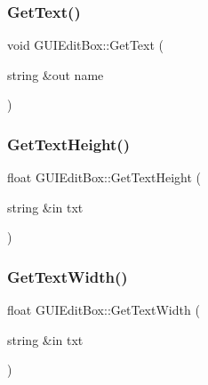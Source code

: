 \hypertarget{class_g_u_i_edit_box_a5a362705212d4106b49bcb913b098bf9}{}\label{class_g_u_i_edit_box_a5a362705212d4106b49bcb913b098bf9} 
\subsubsection{\texorpdfstring{Get\+Text()}{GetText()}}
{\footnotesize\ttfamily void G\+U\+I\+Edit\+Box\+::\+Get\+Text (\begin{DoxyParamCaption}\item[{string \&out}]{name }\end{DoxyParamCaption})}

\hypertarget{class_g_u_i_edit_box_abe03092a77e9a1d174ec2b4451c099d2}{}\label{class_g_u_i_edit_box_abe03092a77e9a1d174ec2b4451c099d2} 
\subsubsection{\texorpdfstring{Get\+Text\+Height()}{GetTextHeight()}}
{\footnotesize\ttfamily float G\+U\+I\+Edit\+Box\+::\+Get\+Text\+Height (\begin{DoxyParamCaption}\item[{string \&in}]{txt }\end{DoxyParamCaption})}

\hypertarget{class_g_u_i_edit_box_ab96661c74aabebfe0c3f1bd91b18f43b}{}\label{class_g_u_i_edit_box_ab96661c74aabebfe0c3f1bd91b18f43b} 
\subsubsection{\texorpdfstring{Get\+Text\+Width()}{GetTextWidth()}}
{\footnotesize\ttfamily float G\+U\+I\+Edit\+Box\+::\+Get\+Text\+Width (\begin{DoxyParamCaption}\item[{string \&in}]{txt }\end{DoxyParamCaption})}

\hypertarget{class_g_u_i_edit_box_a168aec0139b940f093c1472e96050c13}{}\label{class_g_u_i_edit_box_a168aec0139b940f093c1472e96050c13} 
